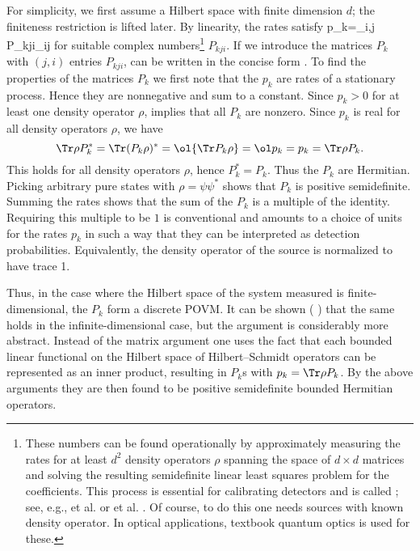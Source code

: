 \documentclass[12pt]{article}
\begin{document}
\bepf
For simplicity, we first assume a Hilbert space with finite
dimension $d$; the finiteness restriction is lifted later. By linearity,
the rates satisfy
p_k=\sum_{i,j} P_{kji}\rho_{ij}
\eeq
for suitable complex numbers\footnote{
These numbers can be found operationally by approximately measuring the
rates for at least $d^2$ density operators $\rho$ spanning the space of
$d\times d$ matrices and solving the resulting semidefinite linear least
squares problem for the coefficients. This process is essential for
calibrating detectors and is called ;
see, e.g.,  et al. \cite{DArMP} or  et al.
\cite{Lun}. Of course, to do this one needs sources with known density
operator. In optical applications, textbook quantum optics is used for
these.
} %
$P_{kji}$. If we introduce the matrices $P_k$ with $(j,i)$ entries
$P_{kji}$,  can be written in the concise form
.
To find the properties of the matrices  $P_k$ we first note that the
$p_k$ are rates of a stationary process. Hence they are nonnegative and
sum to a constant. Since $p_k>0$ for at least one density operator
$\rho$,  implies that all $P_k$ are nonzero. Since
$p_k$ is real for all density operators $\rho$, we have
\[
\Tr\rho P_k^*=\Tr(P_k\rho)^*=\ol{\Tr P_k\rho}=\ol p_k=p_k=\Tr\rho P_k.
\]
This holds for all density operators $\rho$, hence $P_k^* = P_k$. Thus
the $P_k$ are Hermitian.
Picking arbitrary pure states with $\rho=\psi\psi^*$ shows that $P_k$
is positive semidefinite. Summing the rates shows that the sum of the
$P_k$ is a multiple of the identity. Requiring this multiple to be $1$
is conventional and amounts to a choice of units for the rates $p_k$
in such a way that they can be interpreted as detection probabilities.
Equivalently, the density operator of the source is normalized to have
trace 1.

Thus, in the case where the Hilbert space of the system measured is
finite-dimensional, the $P_k$ form a discrete POVM. It can be shown
( \cite[p.41]{deMuy2002}) that the same holds in the
infinite-dimensional case, but the argument is considerably more
abstract. Instead of the matrix argument one uses the fact that each
bounded linear functional on the Hilbert space of Hilbert--Schmidt
operators can be represented as an inner product, resulting in $P_k$s
with $p_k=\Tr\rho P_k$. By the above arguments they are then found to
be positive semidefinite bounded Hermitian operators.
\epf
\end{document}
